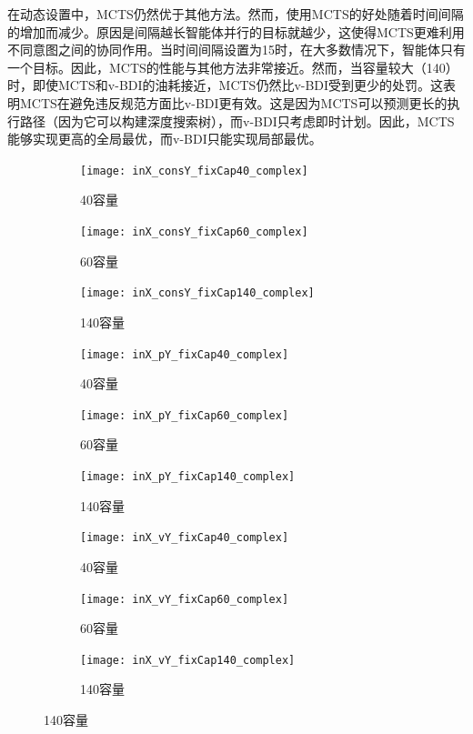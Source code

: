在动态设置中，MCTS仍然优于其他方法。然而，使用MCTS的好处随着时间间隔的增加而减少。原因是间隔越长智能体并行的目标就越少，这使得MCTS更难利用不同意图之间的协同作用。当时间间隔设置为15时，在大多数情况下，智能体只有一个目标。因此，MCTS的性能与其他方法非常接近。然而，当容量较大（140）时，即使MCTS和v-BDI的油耗接近，MCTS仍然比v-BDI受到更少的处罚。这表明MCTS在避免违反规范方面比v-BDI更有效。这是因为MCTS可以预测更长的执行路径（因为它可以构建深度搜索树），而v-BDI只考虑即时计划。因此，MCTS能够实现更高的全局最优，而v-BDI只能实现局部最优。
\begin{figure}[H]
\centering
\begin{subfigure}{.32\textwidth}
  \centering
  \texttt{[image: inX\_consY\_fixCap40\_complex]}
  \caption{40容量}
  \captionsetup{justification=centering}
\end{subfigure}
\begin{subfigure}{.32\textwidth}
  \centering
  \texttt{[image: inX\_consY\_fixCap60\_complex]}
  \caption{60容量}
  \captionsetup{justification=centering}
\end{subfigure}
\begin{subfigure}{.32\textwidth}
  \centering
  \texttt{[image: inX\_consY\_fixCap140\_complex]}
  \caption{140容量}
  \captionsetup{justification=centering}
\end{subfigure}
\begin{subfigure}{.32\textwidth}
  \centering
  \texttt{[image: inX\_pY\_fixCap40\_complex]}
  \caption{40容量}
  \captionsetup{justification=centering}
\end{subfigure}
\begin{subfigure}{.32\textwidth}
  \centering
  \texttt{[image: inX\_pY\_fixCap60\_complex]}
  \caption{60容量}
  \captionsetup{justification=centering}
\end{subfigure}
\begin{subfigure}{.32\textwidth}
  \centering
  \texttt{[image: inX\_pY\_fixCap140\_complex]}
  \caption{140容量}
  \captionsetup{justification=centering}
\end{subfigure}
\begin{subfigure}{.32\textwidth}
  \centering
  \texttt{[image: inX\_vY\_fixCap40\_complex]}
  \caption{40容量}
  \captionsetup{justification=centering}
\end{subfigure}
\begin{subfigure}{.32\textwidth}
  \centering
  \texttt{[image: inX\_vY\_fixCap60\_complex]}
  \caption{60容量}
  \captionsetup{justification=centering}
\end{subfigure}
\begin{subfigure}{.32\textwidth}
  \centering
  \texttt{[image: inX\_vY\_fixCap140\_complex]}
  \caption{140容量}
  \captionsetup{justification=centering}
\end{subfigure}
\captionsetup{justification=centering}
\label{fig:dynamic_complex}
\end{figure}



